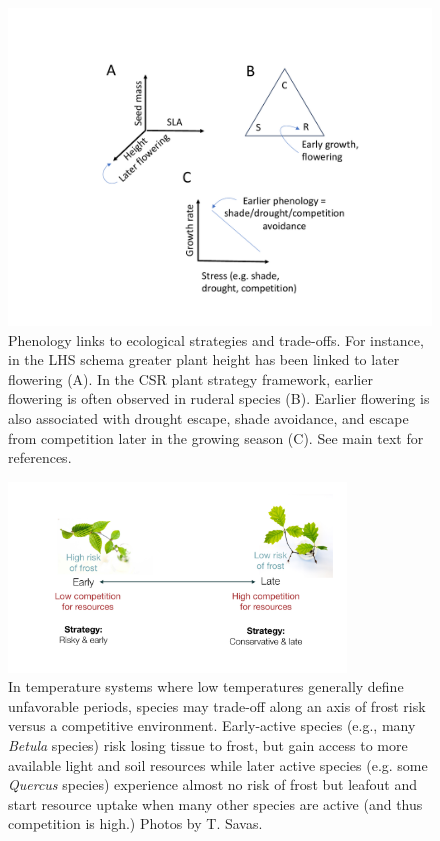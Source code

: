 \documentclass[11pt]{article}
\begin{document}
\begin{figure}[h!]
\centering
\includegraphics[width=1\textwidth]{..//figures/figsubmit/AREESfigure.pdf}
\caption{Phenology links to ecological strategies and trade-offs. For instance, in the LHS schema greater plant height has been linked to later flowering (A). In the CSR plant strategy framework, earlier flowering is often observed in ruderal species (B). Earlier flowering is also associated with drought escape, shade avoidance, and escape from competition later in the growing season (C). See main text for references.}
 \label{fig:traitcorr}
\end{figure}


\begin{figure}[h!]
\centering
\includegraphics[width=0.8\textwidth]{..//figures/figsubmit/wolkovich_CEFE2023wide_slide.pdf}
\caption{In temperature systems where low temperatures generally define unfavorable periods, species may trade-off along an axis of frost risk versus a competitive environment. Early-active species (e.g., many \emph{Betula} species) risk losing tissue to frost, but gain access to more available light and soil resources while later active species  (e.g. some \emph{Quercus} species) experience almost no risk of frost but leafout and start resource uptake when many other species are active (and thus competition is high.) Photos by T. Savas.}
 \label{fig:seasonaltradeoffs}
\end{figure}
\end{document}
